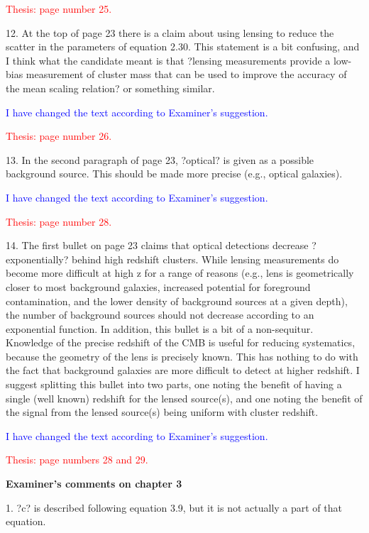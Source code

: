 \documentclass[11pt,a4paper]{article}
\begin{document}
\textcolor{red}{Thesis: page number 25.}

12. At the top of page 23 there is a claim about using lensing to reduce the scatter in
the parameters of equation 2.30. This statement is a bit confusing, and I think
what the candidate meant is that ?lensing measurements provide a low-bias
measurement of cluster mass that can be used to improve the accuracy of the
mean scaling relation? or something similar.

\textcolor{blue}{I have changed the text according to Examiner's suggestion.}

\textcolor{red}{Thesis: page number 26.}

13. In the second paragraph of page 23, ?optical? is given as a possible background
source. This should be made more precise (e.g., optical galaxies).

\textcolor{blue}{I have changed the text according to Examiner's suggestion.}

\textcolor{red}{Thesis: page number 28.}

14. The first bullet on page 23 claims that optical detections decrease ?exponentially?
behind high redshift clusters. While lensing measurements do become more
difficult at high z for a range of reasons (e.g., lens is geometrically closer to most
background galaxies, increased potential for foreground contamination, and the
lower density of background sources at a given depth), the number of
background sources should not decrease according to an exponential function. In
addition, this bullet is a bit of a non-sequitur. Knowledge of the precise redshift of
the CMB is useful for reducing systematics, because the geometry of the lens is
precisely known. This has nothing to do with the fact that background galaxies
are more difficult to detect at higher redshift. I suggest splitting this bullet into two
parts, one noting the benefit of having a single (well known) redshift for the
lensed source(s), and one noting the benefit of the signal from the lensed
source(s) being uniform with cluster redshift.

\textcolor{blue}{I have changed the text according to Examiner's suggestion.}

\textcolor{red}{Thesis: page numbers 28 and 29.}

\begin{center}
\textbf{Examiner's comments on chapter 3}
\end{center}


1. ?c? is described following equation 3.9, but it is not actually a part of that
equation.
\end{document}
